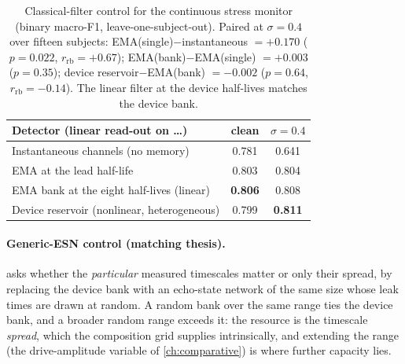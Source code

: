 \begin{table}[t]
  \centering
  \caption[Classical exponential-moving-average control]{Classical-filter control for the continuous stress monitor (binary macro-F1, leave-one-subject-out). Paired at $\sigma=0.4$ over fifteen subjects: EMA(single)$-$instantaneous $=+0.170$ ($p=0.022$, $r_{\mathrm{rb}}=+0.67$); EMA(bank)$-$EMA(single) $=+0.003$ ($p=0.35$); device reservoir$-$EMA(bank) $=-0.002$ ($p=0.64$, $r_{\mathrm{rb}}=-0.14$). The linear filter at the device half-lives matches the device bank.}
  \label{tab:ch5_filter}
  \footnotesize
  \setlength{\tabcolsep}{6pt}
  \begin{tabularx}{\linewidth}{@{}>{\raggedright\arraybackslash}Xcc@{}}
    \toprule
    Detector (linear read-out on \dots) & clean & $\sigma=0.4$ \\
    \midrule
    Instantaneous channels (no memory)            & 0.781 & 0.641 \\
    EMA at the lead half-life                      & 0.803 & 0.804 \\
    EMA bank at the eight half-lives (linear)      & \textbf{0.806} & 0.808 \\
    Device reservoir (nonlinear, heterogeneous)    & 0.799 & \textbf{0.811} \\
    \bottomrule
  \end{tabularx}
\end{table}

\paragraph{Generic-ESN control (matching thesis).}  asks whether the
\emph{particular} measured timescales matter or only their spread, by replacing the
device bank with an echo-state network of the same size whose leak times are drawn at
random. A random bank over the same range ties the device bank, and a broader random
range exceeds it: the resource is the timescale \emph{spread}, which the composition
grid supplies intrinsically, and extending the range (the drive-amplitude variable of
\cref{ch:comparative}) is where further capacity lies.


